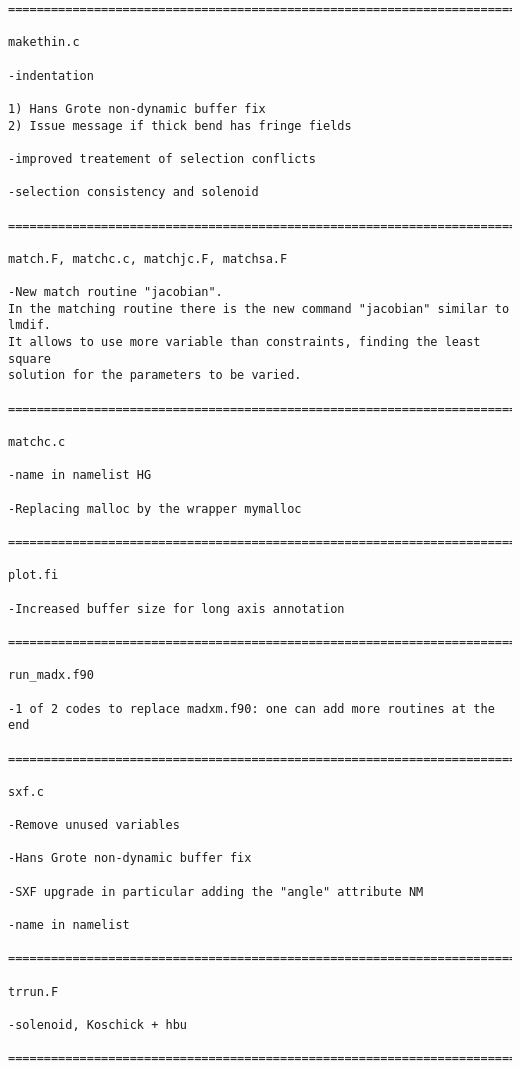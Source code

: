 \begin{verbatim}
=============================================================================

makethin.c

-indentation

1) Hans Grote non-dynamic buffer fix
2) Issue message if thick bend has fringe fields

-improved treatement of selection conflicts

-selection consistency and solenoid

=============================================================================

match.F, matchc.c, matchjc.F, matchsa.F

-New match routine "jacobian".
In the matching routine there is the new command "jacobian" similar to lmdif.
It allows to use more variable than constraints, finding the least square
solution for the parameters to be varied.

=============================================================================

matchc.c

-name in namelist HG

-Replacing malloc by the wrapper mymalloc

=============================================================================

plot.fi

-Increased buffer size for long axis annotation

=============================================================================

run_madx.f90

-1 of 2 codes to replace madxm.f90: one can add more routines at the end

=============================================================================

sxf.c

-Remove unused variables

-Hans Grote non-dynamic buffer fix

-SXF upgrade in particular adding the "angle" attribute NM

-name in namelist

=============================================================================

trrun.F

-solenoid, Koschick + hbu

=============================================================================


\end{verbatim}
